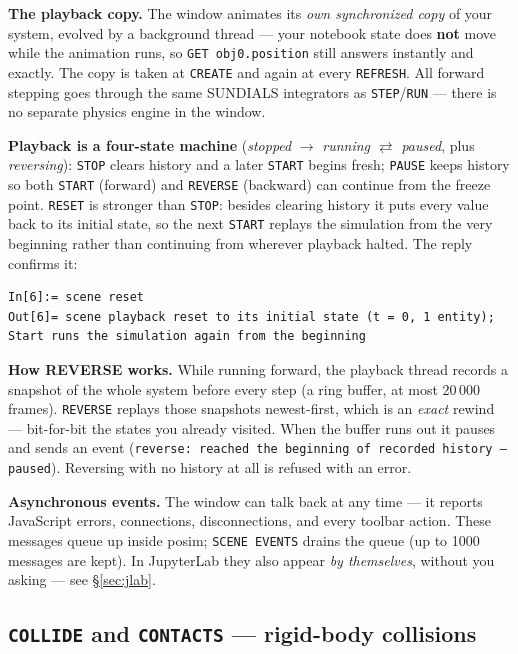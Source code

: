\documentclass[11pt]{article}
\newcommand{\kw}[1]{\texttt{\uppercase{#1}}}
\newcommand{\code}[1]{\texttt{#1}}
\begin{document}
\textbf{The playback copy.} The window animates its \emph{own
synchronized copy} of your system, evolved by a background thread ---
your notebook state does \textbf{not} move while the animation runs, so
\code{GET obj0.position} still answers instantly and exactly. The copy
is taken at \kw{create} and again at every \kw{refresh}. All forward
stepping goes through the same SUNDIALS integrators as
\kw{step}/\kw{run} --- there is no separate physics engine in the
window.

\textbf{Playback is a four-state machine} (\emph{stopped} $\to$
\emph{running} $\rightleftarrows$ \emph{paused}, plus
\emph{reversing}): \kw{stop} clears history and a later \kw{start}
begins fresh; \kw{pause} keeps history so both \kw{start} (forward) and
\kw{reverse} (backward) can continue from the freeze point.
\kw{reset} is stronger than \kw{stop}: besides clearing history it puts
every value back to its initial state, so the next \kw{start} replays
the simulation from the very beginning rather than continuing from
wherever playback halted. The reply confirms it:

\begin{lstlisting}
In[6]:= scene reset
Out[6]= scene playback reset to its initial state (t = 0, 1 entity); Start runs the simulation again from the beginning
\end{lstlisting}

\textbf{How REVERSE works.} While running forward, the playback thread
records a snapshot of the whole system before every step (a ring
buffer, at most 20\,000 frames). \kw{reverse} replays those snapshots
newest-first, which is an \emph{exact} rewind --- bit-for-bit the
states you already visited. When the buffer runs out it pauses and
sends an event (\code{reverse: reached the beginning of recorded
history --- paused}). Reversing with no history at all is refused with
an error.

\textbf{Asynchronous events.} The window can talk back at any time ---
it reports JavaScript errors, connections, disconnections, and every
toolbar action. These messages queue up inside posim; \kw{scene events}
drains the queue (up to 1000 messages are kept). In JupyterLab they
also appear \emph{by themselves}, without you asking --- see
\S\ref{sec:jlab}.

\subsection{\kw{collide} and \kw{contacts} --- rigid-body collisions}
\label{sec:collide}
\end{document}
